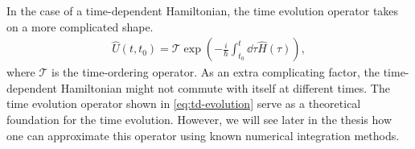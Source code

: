         In the case of a time-dependent Hamiltonian, the time evolution operator
        takes on a more complicated shape.
        \begin{align}
            \hat{U}(t, t_0) =
            \mathcal{T}\exp(
                -\frac{i}{\hslash} \int_{t_0}^{t} \dd\tau
                \hat{H}(\tau)
            ),
            \label{eq:td-evolution}
        \end{align}
        where $\mathcal{T}$ is the time-ordering operator.
        As an extra complicating factor, the time-dependent Hamiltonian might
        not commute with itself at different times.
        The time evolution operator shown in \autoref{eq:td-evolution} serve as
        a theoretical foundation for the time evolution.
        However, we will see later in the thesis how one can approximate this
        operator using known numerical integration methods.

